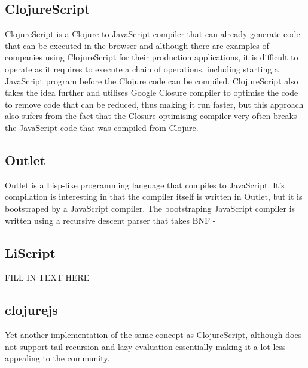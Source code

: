 \subsection{ClojureScript}
ClojureScript is a Clojure to JavaScript compiler that can already generate code that can be executed in the browser and although there are examples of companies using ClojureScript for their production applications, it is difficult to operate as it requires to execute a chain of operations, including starting a JavaScript program before the Clojure code can be compiled.
ClojureScript also takes the idea further and utilises Google Closure compiler to optimise the code to remove code that can be reduced, thus making it run faster, but this approach also sufers from the fact that the Closure optimising compiler very often breaks the JavaScript code that was compiled from Clojure.

\subsection{Outlet}
Outlet is a Lisp-like programming language that compiles to JavaScript. 
It's compilation is interesting in that the compiler itself is written in Outlet, but it is bootstraped by a JavaScript compiler.
The bootstraping JavaScript compiler is written using a recursive descent parser that takes BNF - 

\subsection{LiScript}
FILL IN TEXT HERE

\subsection{clojurejs}
Yet another implementation of the same concept as ClojureScript, although does not support tail recursion and lazy evaluation essentially making it a lot less appealing to the community.

